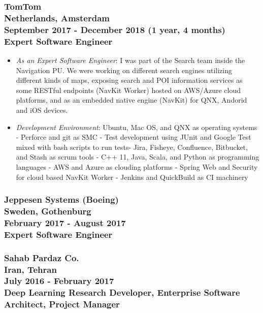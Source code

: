 \documentclass[10pt,a4paper]{article}
\begin{document}
\subsubsection{{ \textbullet \large TomTom} \\
\textnormal{Netherlands, Amsterdam} \\
\textnormal{September 2017 - December 2018 (1 year, 4 months)} \\
{Expert Software Engineer}}
  \setlength{\leftskip}{0.5cm}
  \setlength{\rightskip}{1cm}
  \begin{itemize}
    \setlength{\rightskip}{1cm}
    \setlength\itemsep{0em}
    \item \textit {As an Expert Software Engineer}: I was part of the Search team inside the Navigation PU. We were working on different search engines utilizing different kinds of maps, exposing search and POI information services as some RESTful endpoints (NavKit Worker) hosted on AWS/Azure cloud platforms, and as an embedded native engine (NavKit) for QNX, Andorid and iOS devices.
    \item \textit {Development Environment}: Ubuntu, Mac OS, and QNX as operating systems - Perforce and git as SMC - Test development using JUnit and Google Test mixed with bash scripts to run tests- Jira, Fisheye, Confluence, Bitbucket, and Stash as scrum tools - C++ 11, Java, Scala, and Python as programming languages - AWS and Azure as clouding platforms - Spring Web and Security for cloud based NavKit Worker - Jenkins and QuickBuild as CI machinery
  \end{itemize}
  \setlength{\leftskip}{0pt}
  \setlength{\rightskip}{0cm}
\vspace{0.3cm}

\subsubsection{{\large Jeppesen Systems (Boeing)} \\
\textnormal{Sweden, Gothenburg} \\
\textnormal{February 2017 - August 2017} \\
{Expert Software Engineer}}
\vspace{0.3cm}

\subsubsection{{\large Sahab Pardaz Co.} \\
\textnormal{Iran, Tehran} \\
\textnormal{July 2016 - February 2017} \\
{Deep Learning Research Developer, Enterprise Software Architect, Project Manager}}
\vspace{0.3cm}
\end{document}
